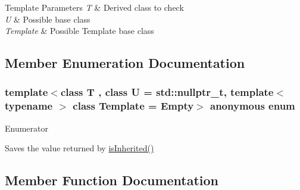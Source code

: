 \begin{DoxyTemplParams}{Template Parameters}
{\em T} & Derived class to check \\
\hline
{\em U} & Possible base class \\
\hline
{\em Template} & Possible Template base class \\
\hline
\end{DoxyTemplParams}


\subsection{Member Enumeration Documentation}
\subsubsection[{\texorpdfstring{anonymous enum}{anonymous enum}}]{\setlength{\rightskip}{0pt plus 5cm}template$<$class T , class U  = std\+::nullptr\+\_\+t, template$<$ typename $>$ class Template = Empty$>$ anonymous enum}\hypertarget{structhandy_1_1impl_1_1IsInherited_ade331c690ccfcc4c9fbe160b83f9491b}{}\label{structhandy_1_1impl_1_1IsInherited_ade331c690ccfcc4c9fbe160b83f9491b}
\begin{Desc}
\item[Enumerator]\par
\begin{description}
\item[{\em 
value\hypertarget{structhandy_1_1impl_1_1IsInherited_ade331c690ccfcc4c9fbe160b83f9491ba3347f5ab27dd0282a949005f868dcde7}{}\label{structhandy_1_1impl_1_1IsInherited_ade331c690ccfcc4c9fbe160b83f9491ba3347f5ab27dd0282a949005f868dcde7}
}]Saves the value returned by \hyperlink{structhandy_1_1impl_1_1IsInherited_ab35b0bbac7a0a30321f1e9f97f66c9c4}{is\+Inherited()} \end{description}
\end{Desc}


\subsection{Member Function Documentation}
